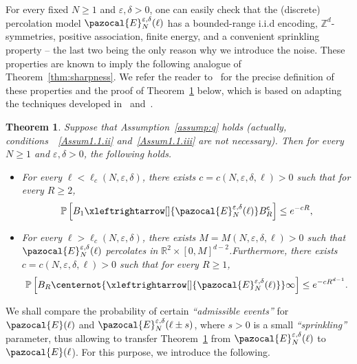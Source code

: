 \documentclass[10pt]{amsart}
\newtheorem{theo}{Theorem}[section]
\theoremstyle{definition}\newtheorem{defi}[theo]{Definition}\newtheorem{rema}[theo]{Remark}\newtheorem{exam}[theo]{Example}\newtheorem{exem}[theo]{Example}\newtheorem{nota}[theo]{Notation}
\renewcommand{\P}{\mathbb{P}}
\newcommand{\R}{\mathbb{R}}
\newcommand{\Z}{\mathbb{Z}}
\newcommand{\sfc}{\mathsf{c}}
\newcommand{\lr}[4]{#3\xleftrightarrow[#1]{#2} #4}
\newcommand{\nlr}[4]{#3\centernot{\xleftrightarrow[#1]{#2}} #4}
\begin{document}
For every fixed $N\geq1$ and $\varepsilon,\delta>0$, one can easily check that the (discrete) percolation model $\pazocal{E}_{N}^{\varepsilon,\delta}(\ell)$ has a bounded-range i.i.d encoding, $\Z^d$-symmetries, positive association, finite energy, and a convenient sprinkling property -- the last two being the only reason why we introduce the noise. These properties are known to imply the following analogue of Theorem~\ref{thm:sharpness}. We refer the reader to~\cite[Section~6]{DGRS19} for the precise definition of these properties and the proof of Theorem~\ref{thm:sharp_finite-range} below, which is based on adapting the techniques developed in~\cite{DumRaoTas17b} and~\cite{GriMar90}.

\begin{theo}\label{thm:sharp_finite-range}
Suppose that Assumption~\ref{assump:q} holds (actually, conditions~~\eqref{Assum1.1.ii} and~\eqref{Assum1.1.iii} are not necessary).
Then for every $N\geq1$ and $\varepsilon,\delta>0$, the following holds.
\begin{itemize}
\item For every $\ell<\ell_c(N,\varepsilon,\delta)$, there exists $c=c(N,\varepsilon,\delta,\ell)>0$ such that for every $R\geq2$,
\begin{equation}\label{eq:exp_decay_truncated}
\P\left[\lr{}{\pazocal{E}_N^{\varepsilon,\delta}(\ell)}{B_1}{B_R^{\sfc}}\right]\leq e^{-cR},
\end{equation}
\item For every $\ell>\ell_c(N,\varepsilon,\delta)$, there exists $M=M(N,\varepsilon,\delta,\ell)>0$ such that $\pazocal{E}_N^{\varepsilon,\delta}(\ell)$ percolates in $\R^2\times[0,M]^{d-2}$.Furthermore, there exists $c=c(N,\varepsilon,\delta,\ell)>0$ such that for every $R\geq1$,
\begin{equation}\label{eq:exp_decay2_truncated}
\P\left[\nlr{}{\pazocal{E}_N^{\varepsilon,\delta}(\ell)}{B_R}{\infty}\right]\leq e^{-cR^{d-1}}.
\end{equation}
\end{itemize}
\end{theo}

We shall compare the probability of certain \emph{``admissible events''} for $\pazocal{E}(\ell)$ and $\pazocal{E}_N^{\varepsilon,\delta}(\ell\pm s)$, where $s>0$ is a small \emph{``sprinkling''} parameter, thus allowing to transfer Theorem~\ref{thm:sharp_finite-range} from $\pazocal{E}_{N}^{\varepsilon,\delta}(\ell)$ to $\pazocal{E}(\ell$). For this purpose, we introduce the following.
\end{document}
